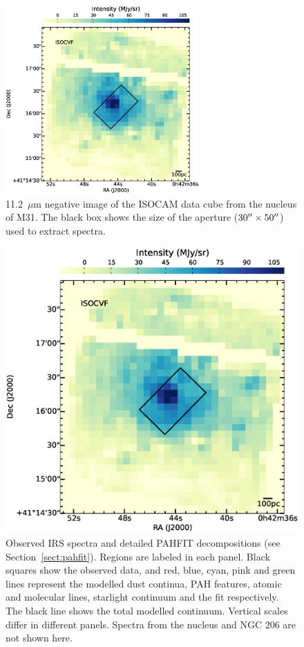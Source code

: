 \begin{figure}
\centering
\includegraphics[width = 7.4cm]{./fig4.eps}
\caption{11.2~$\mu$m negative image of the ISOCAM data cube from the nucleus of M31. 
The black box shows the size of the aperture ($30\hbox{$^{\prime\prime}$}\times50\hbox{$^{\prime\prime}$}$) used to extract spectra.}
\label{isonuc}
\end{figure}



\begin{figure}
\centering
\includegraphics[scale=0.45]{./fig5.eps}
 \caption{Observed IRS spectra and detailed PAHFIT decompositions (see Section~\ref{sect:pahfit}). Regions are labeled in each panel.
Black squares show the observed data, and red, blue, cyan, pink and green lines represent the modelled
dust continua, PAH features, atomic and molecular lines, starlight continuum and the fit respectively. The black line shows the total modelled continuum. 
Vertical scales differ in different panels. Spectra from the nucleus and NGC 206 are not shown here.
}
\label{PAHFITplots}
\end{figure}


